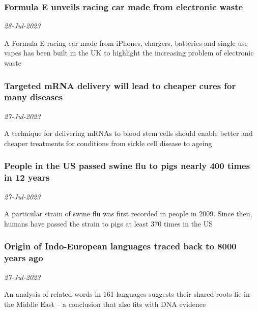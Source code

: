 \subsubsection{Formula E unveils racing car made from electronic waste \href{https://www.newscientist.com/article/2384959-formula-e-unveils-racing-car-made-from-electronic-waste/?utm_campaign=RSS%7CNSNS&utm_source=NSNS&utm_medium=RSS&utm_content=home}{}}
\textit{28-Jul-2023}

A Formula E racing car made from iPhones, chargers, batteries and single-use vapes has been built in the UK to highlight the increasing problem of electronic waste
\subsubsection{Targeted mRNA delivery will lead to cheaper cures for many diseases \href{https://www.newscientist.com/article/2384828-targeted-mrna-delivery-will-lead-to-cheaper-cures-for-many-diseases/?utm_campaign=RSS%7CNSNS&utm_source=NSNS&utm_medium=RSS&utm_content=home}{\ding{225}}}
\textit{27-Jul-2023}

A technique for delivering mRNAs to blood stem cells should enable better and cheaper treatments for conditions from sickle cell disease to ageing
\subsubsection{People in the US passed swine flu to pigs nearly 400 times in 12 years \href{https://www.newscientist.com/article/2385056-people-in-the-us-passed-swine-flu-to-pigs-nearly-400-times-in-12-years/?utm_campaign=RSS%7CNSNS&utm_source=NSNS&utm_medium=RSS&utm_content=home}{}}
\textit{27-Jul-2023}

A particular strain of swine flu was first recorded in people in 2009. Since then, humans have passed the strain to pigs at least 370 times in the US
\subsubsection{Origin of Indo-European languages traced back to 8000 years ago \href{https://www.newscientist.com/article/2385057-origin-of-indo-european-languages-traced-back-to-8000-years-ago/?utm_campaign=RSS%7CNSNS&utm_source=NSNS&utm_medium=RSS&utm_content=home}{\ding{225}}}
\textit{27-Jul-2023}

An analysis of related words in 161 languages suggests their shared roots lie in the Middle East – a conclusion that also fits with DNA evidence
